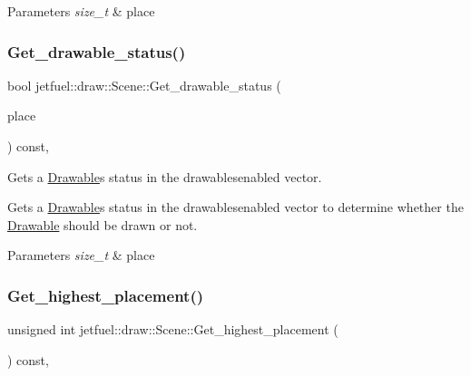 \begin{DoxyParams}{Parameters}
{\em size\+\_\+t} & place \\
\hline
\end{DoxyParams}
\mbox{\label{classjetfuel_1_1draw_1_1Scene_a7442f49028075ad2da9d3c2e450fbe4d}} 
\subsubsection{\texorpdfstring{Get\+\_\+drawable\+\_\+status()}{Get\_drawable\_status()}}
{\footnotesize\ttfamily bool jetfuel\+::draw\+::\+Scene\+::\+Get\+\_\+drawable\+\_\+status (\begin{DoxyParamCaption}\item[{size\+\_\+t}]{place }\end{DoxyParamCaption}) const\hspace{0.3cm}{\ttfamily [inline]}, {\ttfamily [protected]}}



Gets a \hyperlink{classjetfuel_1_1draw_1_1Drawable}{Drawable}\textquotesingle{}s status in the drawablesenabled vector. 

Gets a \hyperlink{classjetfuel_1_1draw_1_1Drawable}{Drawable}\textquotesingle{}s status in the drawablesenabled vector to determine whether the \hyperlink{classjetfuel_1_1draw_1_1Drawable}{Drawable} should be drawn or not.


\begin{DoxyParams}{Parameters}
{\em size\+\_\+t} & place \\
\hline
\end{DoxyParams}
\mbox{\label{classjetfuel_1_1draw_1_1Scene_a439de5e14d13f06db5acd2da708dc177}} 
\subsubsection{\texorpdfstring{Get\+\_\+highest\+\_\+placement()}{Get\_highest\_placement()}}
{\footnotesize\ttfamily unsigned int jetfuel\+::draw\+::\+Scene\+::\+Get\+\_\+highest\+\_\+placement (\begin{DoxyParamCaption}{ }\end{DoxyParamCaption}) const\hspace{0.3cm}{\ttfamily [inline]}, {\ttfamily [protected]}}



